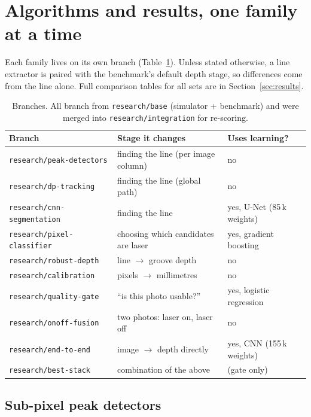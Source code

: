 \section{Algorithms and results, one family at a time}\label{sec:algos}

Each family lives on its own branch (Table~\ref{tab:branches}). Unless stated otherwise, a line extractor is paired
with the benchmark's default depth stage, so differences come from the line alone. Full comparison tables for all
sets are in Section~\ref{sec:results}.

\begin{table}[H]
\centering\small
\caption{Branches. All branch from \texttt{research/base} (simulator + benchmark) and were merged into
\texttt{research/integration} for re-scoring.}\label{tab:branches}
\begin{tabular}{@{}lll@{}}
\toprule
Branch & Stage it changes & Uses learning? \\
\midrule
\texttt{research/peak-detectors} & finding the line (per image column) & no \\
\texttt{research/dp-tracking} & finding the line (global path) & no \\
\texttt{research/cnn-segmentation} & finding the line & yes, U-Net (85\,k weights) \\
\texttt{research/pixel-classifier} & choosing which candidates are laser & yes, gradient boosting \\
\texttt{research/robust-depth} & line $\rightarrow$ groove depth & no \\
\texttt{research/calibration} & pixels $\rightarrow$ millimetres & no \\
\texttt{research/quality-gate} & ``is this photo usable?'' & yes, logistic regression \\
\texttt{research/onoff-fusion} & two photos: laser on, laser off & no \\
\texttt{research/end-to-end} & image $\rightarrow$ depth directly & yes, CNN (155\,k weights) \\
\texttt{research/best-stack} & combination of the above & (gate only) \\
\bottomrule
\end{tabular}
\end{table}

\subsection{Sub-pixel peak detectors}\label{sec:peak}

